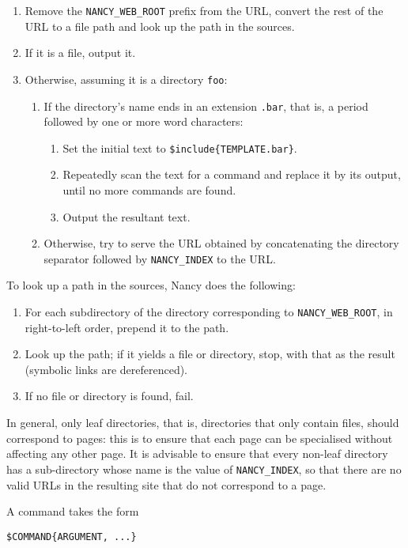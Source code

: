 \documentclass[english]{scrartcl}
\begin{document}
\begin{enumerate}
\item Remove the \verb|NANCY_WEB_ROOT| prefix from the URL, convert the rest of the URL to a file path and look up the path in the sources.
\item If it is a file, output it.
\item Otherwise, assuming it is a directory \verb|foo|:
\begin{enumerate}
\item If the directory’s name ends in an extension \verb|.bar|, that is, a period followed by one or more word characters:
\begin{enumerate}
\item Set the initial text to \verb|$include{TEMPLATE.bar}|.
\item Repeatedly scan the text for a command and replace it by its output, until no more commands are found.
\item Output the resultant text.
\end{enumerate}
\item Otherwise, try to serve the URL obtained by concatenating the directory separator followed by \verb|NANCY_INDEX| to the URL.
\end{enumerate}
\end{enumerate}

To look up a path in the sources, Nancy does the following:

\begin{enumerate}
\item For each subdirectory of the directory corresponding to \verb|NANCY_WEB_ROOT|, in right-to-left order, prepend it to the path.
\item Look up the path; if it yields a file or directory, stop, with that as the result (symbolic links are dereferenced).
\item If no file or directory is found, fail.
\end{enumerate}

In general, only leaf directories, that is, directories that only contain files, should correspond to pages: this is to ensure that each page can be specialised without affecting any other page. It is advisable to ensure that every non-leaf directory has a sub-directory whose name is the value of \verb|NANCY_INDEX|, so that there are no valid URLs in the resulting site that do not correspond to a page.

A command takes the form

\begin{verbatim}
$COMMAND{ARGUMENT, ...}
\end{verbatim}
\end{document}

